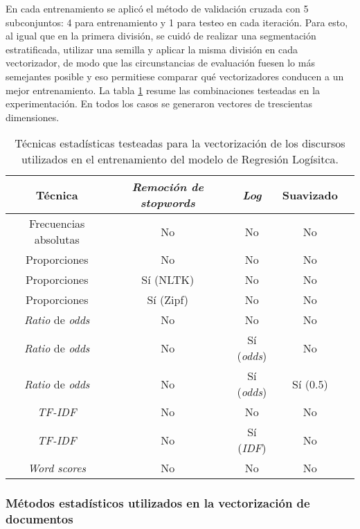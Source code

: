 En cada entrenamiento se aplic\'o el m\'etodo
de validaci\'on cruzada con 5 subconjuntos: 4 para entrenamiento y 1 para testeo
en cada iteraci\'on.
Para esto, al igual que en la primera divisi\'on, se cuid\'o de realizar
una segmentaci\'on estratificada, utilizar una semilla y
aplicar la misma divisi\'on en cada vectorizador,
de modo que las circunstancias de evaluaci\'on fuesen lo m\'as semejantes posible
y eso permitiese comparar qu\'e vectorizadores conducen a un mejor entrenamiento.
La tabla \ref{table-methods-vectorizers} resume las combinaciones testeadas
en la experimentaci\'on. En todos los casos se generaron vectores de trescientas
dimensiones.

\begin{table}[ht]
\centering
\begin{tabular}{ |c|c|c|c|c| }
    \hline
    T\'ecnica & \textit{Remoci\'on de stopwords} & \textit{Log} & Suavizado \\
    \hline\hline
    Frecuencias absolutas & No & No & No \\
    \hline
    Proporciones & No & No & No \\
    \hline
    Proporciones & S\'i (NLTK) & No & No \\
    \hline
    Proporciones & S\'i (Zipf) & No & No \\
    \hline
    \textit{Ratio} de \textit{odds} & No & No & No \\
    \hline
    \textit{Ratio} de \textit{odds} & No & S\'i (\textit{odds}) & No \\
    \hline
    \textit{Ratio} de \textit{odds} & No & S\'i (\textit{odds}) & S\'i ($0.5$) \\
    \hline
    \textit{TF-IDF} & No & No & No \\
    \hline
    \textit{TF-IDF} & No & S\'i (\textit{IDF}) & No \\
    \hline
    \textit{Word scores} & No & No & No \\
    \hline
\end{tabular}
\caption{T\'ecnicas estad\'isticas testeadas para la vectorizaci\'on de los
discursos utilizados en el entrenamiento del modelo de Regresi\'on Log\'isitca.}
\label{table-methods-vectorizers}
\end{table}

\subsubsection{M\'etodos estad\'isticos utilizados en la vectorizaci\'on de documentos}
\label{subsubsec-methods-vectorizers}

